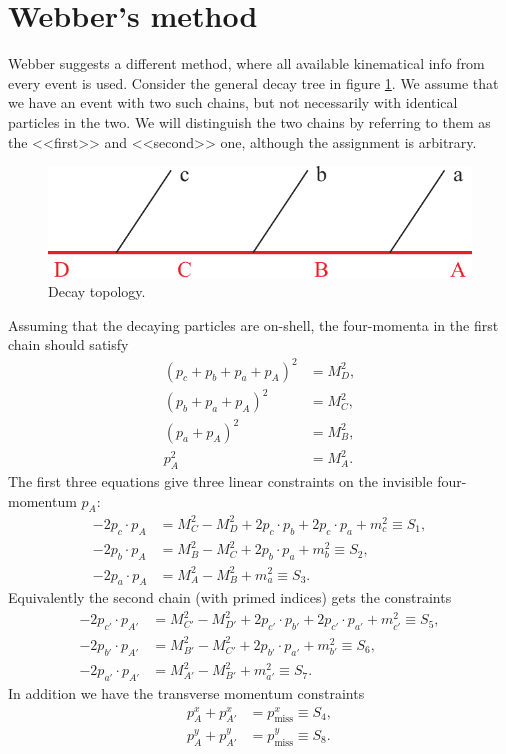 \documentclass[twoside,english]{uiofysmaster}
\begin{document}
\section{Webber's method}
Webber \cite{Webber:2009vm} suggests a different method, where all available kinematical info from every event is used. Consider the general decay tree in figure \ref{fig:decaytree}. We assume that we have an event with two such chains, but not necessarily with identical particles in the two. We will distinguish the two chains by referring to them as the <<first>> and <<second>> one, although the assignment is arbitrary.
\begin{figure}[hbt]
\centering
\includegraphics[scale=0.7]{figures/fig-chain.pdf} %
\caption{Decay topology.}
\label{fig:decaytree}
\end{figure}
Assuming that the decaying particles are on-shell, the four-momenta in the first chain should satisfy
\begin{align}
	(p_c + p_b + p_a + p_A)^2 &= M_D^2,\nonumber \\
	(p_b + p_a + p_A)^2 &= M_C^2,\nonumber \\
	(p_a + p_A)^2 &= M_B^2,\label{eq:constraints}\\
	p_A^2 &= M_A^2.\nonumber
\end{align}
The first three equations give three linear constraints on the invisible four-momentum $p_A$:
\begin{align}
	-2p_c\cdot p_A &= M_C^2 - M_D^2 + 2p_c\cdot p_b + 2p_c \cdot p_a + m_c^2 \equiv S_1,\nonumber \\
	-2p_b\cdot p_A &= M_B^2 - M_C^2 + 2p_b\cdot p_a + m_b^2 \equiv S_2,\\
	-2p_a\cdot p_A &= M_A^2 - M_B^2 + m_a^2 \equiv S_3. \nonumber
\end{align}
Equivalently the second chain (with primed indices) gets the constraints
\begin{align}
	-2p_{c'}\cdot p_{A'} &= M_{C'}^2 - M_{D'}^2 + 2p_{c'}\cdot p_{b'} + 2p_{c'} \cdot p_{a'} + m_{c'}^2 \equiv S_5,\nonumber \\ 
	-2p_{b'}\cdot p_{A'} &= M_{B'}^2 - M_{C'}^2 + 2p_{b'}\cdot p_{a'} + m_{b'}^2 \equiv S_6,\\
	-2p_{a'}\cdot p_{A'} &= M_{A'}^2 - M_{B'}^2 + m_{a'}^2 \equiv S_7.\nonumber
\end{align}
In addition we have the transverse momentum constraints
\begin{align}
	p_A^x + p_{A'}^x &= p_\mathrm{miss}^x \equiv S_4, \label{eq:Svec_orig} \\
	p_A^y + p_{A'}^y &= p_\mathrm{miss}^y \equiv S_8. \nonumber
\end{align}
\end{document}
